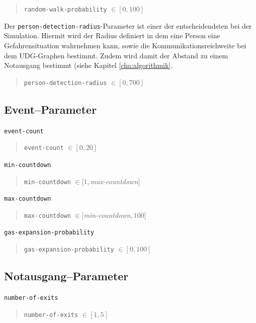 \begin{quote}
\verb|random-walk-probability| $\in [0, 100]$
\end{quote}

Der \verb|person-detection-radius|-Parameter ist einer der entscheidendsten bei der Simulation. Hiermit wird der Radius definiert in dem eine Person eine Gefahrensituation wahrnehmen kann, sowie die Kommunikationsreichweite bei dem UDG-Graphen bestimmt. Zudem wird damit der Abstand zu einem Notausgang bestimmt (siehe Kapitel \ref{cha:algorithmik}.

\begin{quote}
\verb|person-detection-radius| $\in [0, 700]$
\end{quote}



\subsection{Event--Parameter}
\label{sec:gui_event}


\verb|event-count|

\begin{quote}
\verb|event-count| $\in [0, 20]$
\end{quote}


\verb|min-countdown|

\begin{quote}
\verb|min-countdown| $\in [1, $\textit{max-countdown}$]$
\end{quote}



\verb|max-countdown|

\begin{quote}
\verb|max-countdown| $\in [$\textit{min-countdown}$, 100]$
\end{quote}


\verb|gas-expansion-probability|

\begin{quote}
\verb|gas-expansion-probability| $\in [0, 100]$
\end{quote}


\subsection{Notausgang--Parameter}
\label{sec:gui_exit}

\verb|number-of-exits|

\begin{quote}
\verb|number-of-exits| $\in [1, 5]$
\end{quote}

